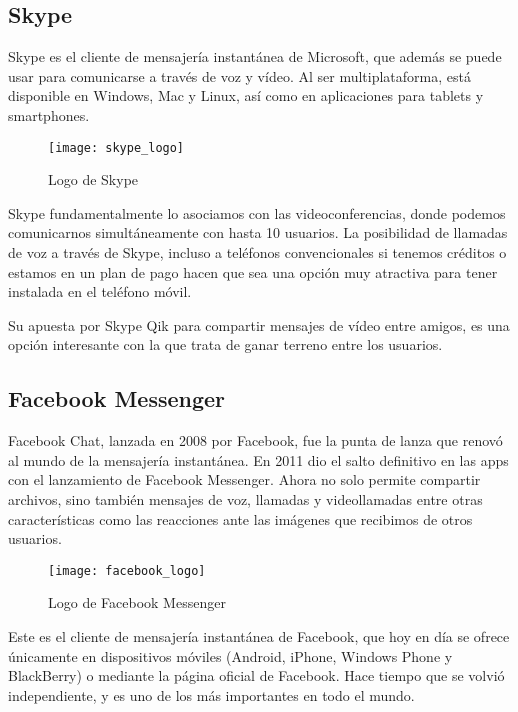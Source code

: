 \subsection{Skype}

Skype es el cliente de mensajería instantánea de Microsoft, que además se puede usar para comunicarse a través de voz y vídeo. Al ser multiplataforma, está disponible en Windows, Mac y Linux, así como en aplicaciones para tablets y smartphones.

\begin{figure}[htp!]
  \centering
  \texttt{[image: skype\_logo]}
  \caption{Logo de Skype}
  \label{fig:skype_logo}
\end{figure}

Skype fundamentalmente lo asociamos con las videoconferencias, donde podemos comunicarnos simultáneamente con hasta 10 usuarios.  La posibilidad de llamadas de voz a través de Skype, incluso a teléfonos convencionales si tenemos créditos o estamos en un plan de pago hacen que sea una opción muy atractiva para tener instalada en el teléfono móvil.

Su apuesta por Skype Qik para compartir mensajes de vídeo entre amigos, es una opción interesante con la que trata de ganar terreno entre los usuarios.

\subsection{Facebook Messenger}

Facebook Chat, lanzada en 2008 por Facebook, fue la punta de lanza que renovó al mundo de la mensajería instantánea. En 2011 dio el salto definitivo en las apps con el lanzamiento de Facebook Messenger. Ahora no solo permite compartir archivos, sino también mensajes de voz, llamadas y videollamadas entre otras características como las reacciones ante las imágenes que recibimos de otros usuarios.

\begin{figure}[htp!]
  \centering
  \texttt{[image: facebook\_logo]}
  \caption{Logo de Facebook Messenger}
  \label{fig:facebook_logo}
\end{figure}

Este es el cliente de mensajería instantánea de Facebook, que hoy en día se ofrece únicamente en dispositivos móviles (Android, iPhone, Windows Phone y BlackBerry) o mediante la página oficial de Facebook. Hace tiempo que se volvió independiente, y es uno de los más importantes en todo el mundo.

